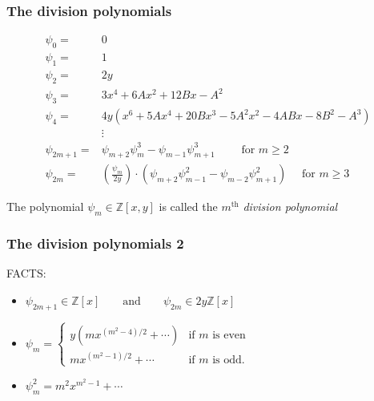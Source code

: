 \documentclass[12pt,handout]{beamer} %
\theoremstyle{definition}
\begin{document}
\begin{frame}\frametitle{The division polynomials}\pause

\begin{Definition}[Division Polynomials of $E:y^2=x^3+Ax+B$ ($p>3$)]\vspace*{-0.7cm}
{\small \begin{align*}
        \psi_{0} =& 0\\
        \psi_{1} =& 1\\
        \psi_{2} =& 2y\\
        \psi_{3} =& 3x^{4} + 6Ax^{2} + 12Bx - A^{2}\\
        \psi_{4} =& 4y(x^{6} + 5Ax^{4} + 20Bx^{3} - 5A^{2}x^{2} - 4ABx - 8B^{2} - A^{3}) \\
        &\vdots\\
        \psi_{2m+1} =& \psi_{m+2}\psi_{m}^{3}-\psi_{m-1}\psi^{3}_{m+1} \qquad \text{ for } m \geq 2\\
        \psi_{2m}  =& \left(\frac{\psi_{m}}{2y}\right)\cdot(\psi_{m+2}\psi^{2}_{m-1}-\psi_{m-2}\psi^{2}_{m+1}) \quad \text{ for } m \geq 3
\end{align*}}

The polynomial $\psi_m\in{\mathbb Z}[x,y]$ is called the $m^{\text{th}}$ \emph{division polynomial}
\end{Definition}
\end{frame}



\begin{frame}\frametitle{The division polynomials 2}\pause

\begin{beamerboxesrounded}[upper=block title example,lower=block body alerted,shadow=true]{FACTS:}
\begin{itemize}
\item $\psi_{2m+1}\in\mathbb{Z}[x]\qquad\text{and}\qquad\psi_{2m}\in 2y\mathbb{Z}[x]$
\item $\psi_m=\begin{cases} y(mx^{(m^2-4)/2}+\cdots) &\text{if $m$ is even}\\
mx^{(m^2-1)/2}+\cdots &\text{if $m$ is odd.}\end{cases}$
\item $\psi_m^2=m^2x^{m^2-1}+\cdots$
\end{itemize}
\end{beamerboxesrounded}

\end{frame}
\end{document}
